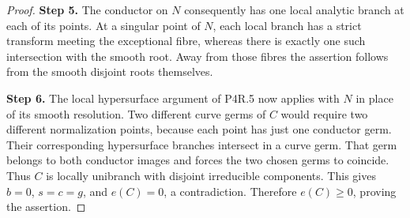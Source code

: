 \begin{proof}
\noindent\textbf{Step 5.} The conductor on $N$ consequently has
one local analytic branch at each of
its points. At a singular point of $N$,
each local branch has a strict transform
meeting the exceptional fibre, whereas
there is exactly one such intersection
with the smooth root. Away from those
fibres the assertion follows from the
smooth disjoint roots themselves.

\noindent\textbf{Step 6.} The local hypersurface argument of
P4R.5 now applies with $N$ in place of
its smooth resolution. Two different
curve germs of $C$ would require two
different normalization points, because
each point has just one conductor germ.
Their corresponding hypersurface
branches intersect in a curve germ.
That germ belongs to both conductor
images and forces the two chosen germs
to coincide. Thus $C$ is locally
unibranch with disjoint irreducible
components. This gives $b=0$, $s=c=g$,
and $e(C)=0$, a contradiction.
Therefore $e(C)\ge0$, proving the
assertion.
\end{proof}

